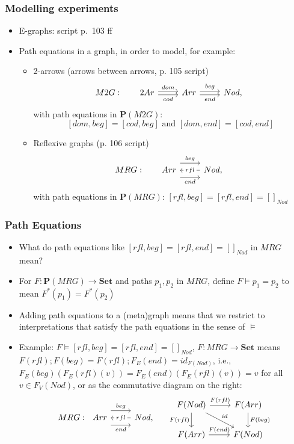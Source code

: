 \documentclass[handout]{beamer}
\newcommand{\bfsf}[1]{{\boldsymbol{#1}}}
\newcommand{\Set}{\bfsf{Set}}
\newcommand{\PP}{\bfsf{P}}
\begin{document}
\frame
  {   
    \frametitle{Modelling experiments}\label{Ch3:Modelling}

 \begin{itemize}[<+->]
\item E-graphs: script p.\ 103 ff
\item Path equations in a graph, in order to model, for example:
   \begin{itemize}[<+->]
\item 2-arrows (arrows between arrows, p. 105 script)
\[M2G:~~~~~ 
\begin{tikzcd}[ampersand replacement=\&]
2Ar \arrow[yshift=0.5ex]{r}{dom} \arrow[swap, yshift=-0.5ex]{r}{cod} \& Arr \arrow[yshift=0.5ex]{r}{beg} \arrow[swap, yshift=-0.5ex]{r}{end} \& Nod,
\end{tikzcd}\]
with path equations in $\PP(M2G)$:
\[
[dom,beg]=[cod,beg] \text{~and~} [dom,end]=[cod,end]
\] 
\item Reflexive graphs (p. 106 script)
 \[MRG:~~~~~
\begin{tikzcd}[ampersand replacement=\&]
Arr \arrow[yshift=2ex]{r}{beg} \arrow[swap, yshift=-2ex]{r}{end}  \& \arrow{l}[description]{rfl} Nod,
\end{tikzcd}\] 
with path equations in $\PP(MRG)$: $[rfl,beg]=[rfl,end]=[]_{Nod}$ 
   \end{itemize}

 \end{itemize}

 }

\frame
  {   
    \frametitle{Path Equations}\label{Ch3:PathEqs}

 \begin{itemize}[<+->]
\item What do path equations like $[rfl,beg]=[rfl,end]=[]_{Nod}$ in $MRG$ mean?
\item For $F : \PP(MRG)\to\Set$ and paths $p_1,p_2$ in $MRG$, define $F\models p_1=p_2$
to mean $F^*(p_1) = F^*(p_2)$
\item Adding path equations to a (meta)graph means that we restrict to interpretations
that satisfy the path equations in the sense of $\models$
\item Example: $F\models [rfl,beg]=[rfl,end]=[]_{Nod}$, $F: MRG\to\Set$
means $F(rfl);F(beg)=F(rfl);F_E(end)=id_{F(Nod)}$, i.e., 
$F_E(beg)(F_E(rfl)(v)) = F_E(end)(F_E(rfl)(v)) = v$ for all $v\in F_V(Nod)$,
or as the commutative diagram on the right:
 \[
\begin{tikzcd}[ampersand replacement=\&]
MRG: ~ ~Arr \arrow[yshift=2ex]{r}{beg} \arrow[swap, yshift=-2ex]{r}{end}  \& \arrow{l}[description]{rfl} Nod,
\end{tikzcd}
~~ ~ ~ \begin{tikzcd}[ampersand replacement=\&]
F(Nod) \arrow{r}{F(rfl)}\arrow[swap]{d}{F(rfl)}\arrow{rd}{id}\& F(Arr) \arrow{d}{F(beg)} \\
F(Arr) \arrow{r}{F(end)} \& F(Nod)
\end{tikzcd}
\]

 \end{itemize}

 }
\end{document}
